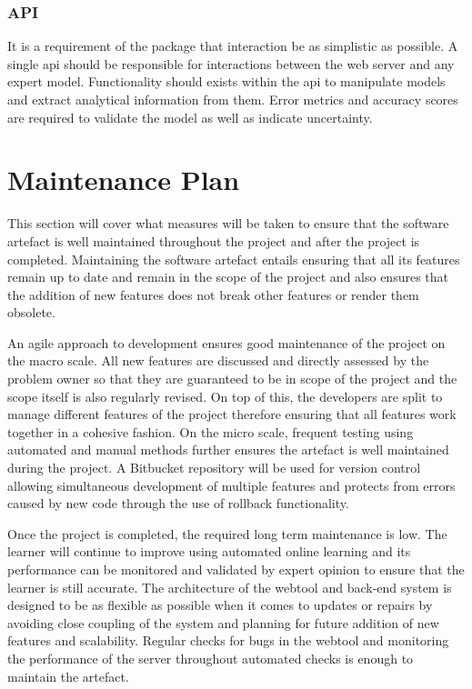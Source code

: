 \documentclass{ecmm427_assignment}
\begin{document}
\subsubsection{API}

It is a requirement of the package that interaction be as simplistic as possible. A single api should be responsible for interactions between the web server and any expert model. Functionality should exists within the api to manipulate models and extract analytical information from them. Error metrics and accuracy scores are required to validate the model as well as indicate uncertainty.

\section{Maintenance Plan}
This section will cover what measures will be taken to ensure that the software artefact is well maintained throughout the project and after the project is completed. Maintaining the software artefact entails ensuring that all its features remain up to date and remain in the scope of the project and also ensures that the addition of new features does not break other features or render them obsolete.\par

An agile approach to development ensures good maintenance of the project on the macro scale. All new features are discussed and directly assessed by the problem owner so that they are guaranteed to be in scope of the project and the scope itself is also regularly revised. On top of this, the developers are split to manage different features of the project therefore ensuring that all features work together in a cohesive fashion. On the micro scale, frequent testing using automated and manual methods further ensures the artefact is well maintained during the project. A Bitbucket repository will be used for version control allowing simultaneous development of multiple features and protects from errors caused by new code through the use of rollback functionality.\par

Once the project is completed, the required long term maintenance is low. The learner will continue to improve using automated online learning and its performance can be monitored and validated by expert opinion to ensure that the learner is still accurate. The architecture of the webtool and back-end system is designed to be as flexible as possible when it comes to updates or repairs by avoiding close coupling of the system and planning for future addition of new features and scalability. Regular checks for bugs in the webtool and monitoring the performance of the server throughout automated checks is enough to maintain the artefact.
\end{document}
